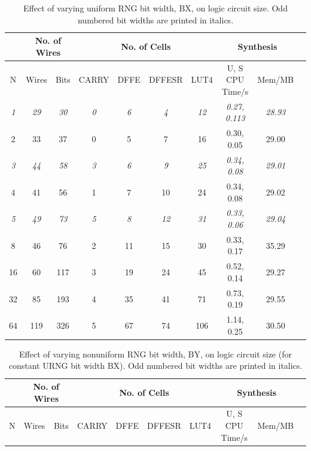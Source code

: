 \documentclass[12pt]{article}
\begin{document}
      \begin{table}[H]
        \centering
        \begin{tabular}{|c||c|c|c|c|c|c|c|c|c|}
          \hline
          &
          \multicolumn{2}{|c|}{No. of Wires}
          &
          \multicolumn{4}{|c|}{No. of Cells}
          &
          \multicolumn{2}{|c|}{Synthesis}\\
          \hline
          N & Wires & Bits & CARRY & DFFE & DFFESR & LUT4 & U, S CPU Time/s & Mem/MB\\
          \hline
          \hline
          \textit{1} & \textit{29} & \textit{30} & \textit{0} & \textit{6} & \textit{4} & \textit{12} & \textit{0.27, 0.113} & \textit{28.93}\\
          \hline
          2 & 33 & 37 & 0 & 5 & 7 & 16 & 0.30, 0.05 & 29.00\\
          \hline
          \textit{3} & \textit{44} & \textit{58} & \textit{3} & \textit{6} & \textit{9} & \textit{25} & \textit{0.34, 0.08} & \textit{29.01}\\
          \hline
          4 & 41 & 56 & 1 & 7 & 10 & 24 & 0.34, 0.08 & 29.02\\
          \hline
          \textit{5} & \textit{49} & \textit{73} & \textit{5} & \textit{8} & \textit{12} & \textit{31} & \textit{0.33, 0.06} & \textit{29.04}\\
          \hline
          8 & 46 & 76 & 2 & 11 & 15 & 30 & 0.33, 0.17 & 35.29\\
          \hline
          16 & 60 & 117 & 3 & 19 & 24 & 45 & 0.52, 0.14 & 29.27\\
          \hline
          32 & 85 & 193 & 4 & 35 & 41 & 71 & 0.73, 0.19 & 29.55\\
          \hline
          64 & 119 & 326 & 5 & 67 & 74 & 106 & 1.14, 0.25 & 30.50\\
          \hline
        \end{tabular}
        \caption{Effect of varying uniform RNG bit width, BX, on logic circuit size. Odd numbered bit widths are printed in italics.}
        \label{table:urng_bx}
      \end{table}

      \begin{table}[H]
        \centering
        \begin{tabular}{|c||c|c|c|c|c|c|c|c|c|}
          \hline
          &
          \multicolumn{2}{|c|}{No. of Wires}
          &
          \multicolumn{4}{|c|}{No. of Cells}
          &
          \multicolumn{2}{|c|}{Synthesis}\\
          \hline
          N & Wires & Bits & CARRY & DFFE & DFFESR & LUT4 & U, S CPU Time/s & Mem/MB\\
          \hline
          \hline

          \hline
        \end{tabular}
        \caption{Effect of varying nonuniform RNG bit width, BY, on logic circuit size (for constant URNG bit width BX). Odd numbered bit widths are printed in italics.}
        \label{table:rng_by}
      \end{table}
\end{document}
